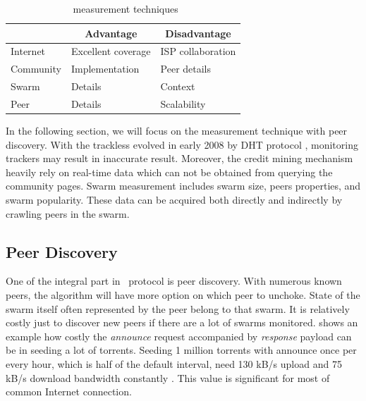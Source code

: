 \begin{table}[ht]
	\centering
	\caption{\bt~measurement techniques \cite{2010:btworld:wojciechowski}}
	\label{tbl:btmeasuremethod}
	\begin{tabular}{|l|l|l|}
		\hline
		\rowcolor[HTML]{C0C0C0} 
		\multicolumn{1}{|c|}{\cellcolor[HTML]{C0C0C0}\textbf{Level}} & \multicolumn{1}{c|}{\cellcolor[HTML]{C0C0C0}\textbf{Advantage}} & \multicolumn{1}{c|}{\cellcolor[HTML]{C0C0C0}\textbf{Disadvantage}} \\ \hline
		Internet & Excellent coverage & ISP collaboration \\ \hline
		Community & Implementation & Peer details \\ \hline
		Swarm & Details & Context \\ \hline
		Peer & Details & Scalability \\ \hline
	\end{tabular}
\end{table}

In the following section, we will focus on the measurement technique with peer discovery. With the trackless \bt evolved in early 2008 by DHT protocol \cite{2008:dht:loewenstern}, monitoring trackers may result in inaccurate result. Moreover, the credit mining mechanism heavily rely on real-time data which can not be obtained from querying the community pages. Swarm measurement includes swarm size, peers properties, and swarm popularity. These data can be acquired both directly and indirectly by crawling peers in the swarm.

\subsection{Peer Discovery}
One of the integral part in \bt~protocol is peer discovery. With numerous known peers, the algorithm will have more option on which peer to unchoke. State of the swarm itself often represented by the peer belong to that swarm. It is relatively costly just to discover new peers if there are a lot of swarms monitored. \citeauthor{2012:milliontorrent:arvid} shows an example how costly the \textit{announce} request accompanied by \textit{response} payload can be in seeding a lot of torrents. Seeding 1 million torrents with announce once per every hour, which is half of the default interval, need 130 kB/s upload and 75 kB/s download bandwidth constantly \cite{2012:milliontorrent:arvid}. This value is significant for most of common Internet connection.


